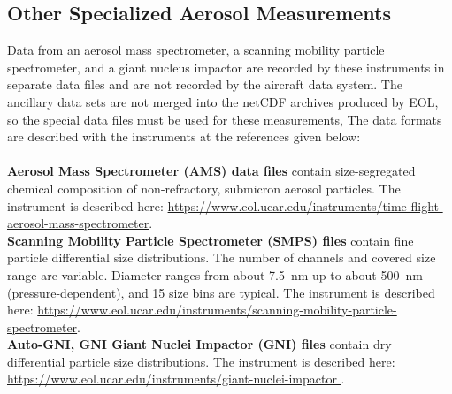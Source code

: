 \subsection{Other Specialized Aerosol Measurements}
\begin{hangparagraphs}
Data from an aerosol mass spectrometer,
a scanning mobility particle spectrometer, and a giant
nucleus impactor are recorded by these
instruments in separate data files and are not recorded by the aircraft
data system. The ancillary data
sets are not merged into the netCDF archives produced by EOL, so the
special data files must be used for these measurements, The data formats
are described with the instruments at the references given below:\\
\\
\textbf{Aerosol Mass Spectrometer (AMS) data files} contain size-segregated
chemical composition of non-refractory, submicron aerosol particles.
The instrument is described here: \href{https://www.eol.ucar.edu/instruments/time-flight-aerosol-mass-spectrometer}{https://www.eol.ucar.edu/instruments/time-flight-aerosol-mass-spectrometer}.\\
\textbf{Scanning Mobility Particle Spectrometer (SMPS) files} contain
fine particle differential size distributions. The number of channels
and covered size range are variable. Diameter ranges from about 7.5~nm
up to about 500~nm (pressure-dependent), and 15 size bins are typical.
The instrument is described here: \href{https://www.eol.ucar.edu/instruments/scanning-mobility-particle-spectrometer}{https://www.eol.ucar.edu/instruments/scanning-mobility-particle-spectrometer}.\\
\textbf{Auto-GNI, GNI Giant Nuclei Impactor (GNI) files} contain dry
differential particle size distributions. The instrument is described
here: \href{https://www.eol.ucar.edu/instruments/giant-nuclei-impactor }{https://www.eol.ucar.edu/instruments/giant-nuclei-impactor }.
\end{hangparagraphs}



